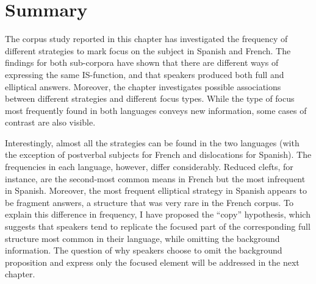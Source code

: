 \section{Summary}
The corpus study reported in this chapter has investigated the frequency of different strategies to mark focus on the subject in Spanish and French. The findings for both sub-corpora have shown that there are different ways of expressing the same IS-function, and that speakers produced both full and elliptical answers.
Moreover, the chapter investigates possible associations between different strategies and different focus types. While the type of focus most frequently found in both languages conveys new information, some cases of contrast are also visible.

Interestingly, almost all the strategies can be found in the two languages (with the exception of postverbal subjects for French and dislocations for Spanish). The frequencies in each language, however, differ considerably.
Reduced clefts, for instance, are the second-most common means in French but the most infrequent in Spanish. Moreover, the most frequent elliptical strategy in Spanish appears to be fragment answers, a structure that was very rare in the French corpus. To explain this difference in frequency, I have proposed the ``copy” hypothesis, which suggests that speakers tend to replicate the focused part of the corresponding full structure most common in their language, while omitting the background information. The question of why speakers choose to omit the background proposition and express only the focused element will be addressed in the next chapter.
